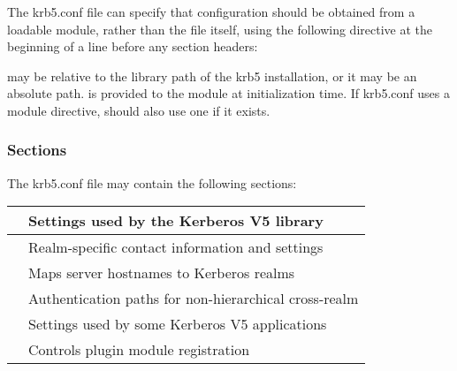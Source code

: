 \documentclass[letterpaper,10pt,english]{sphinxmanual}
\begin{document}
The krb5.conf file can specify that configuration should be obtained
from a loadable module, rather than the file itself, using the
following directive at the beginning of a line before any section
headers:

%
\begin{sphinxVerbatim}[commandchars=\\\{\}]
 
\end{sphinxVerbatim}

 may be relative to the library path of the krb5
installation, or it may be an absolute path.   is provided
to the module at initialization time.  If krb5.conf uses a module
directive, {\hyperref[\detokenize{admin/conf_files/kdc_conf:kdc-conf-5}]{}} should also use one if it exists.


\subsubsection{Sections}
\label{\detokenize{admin/conf_files/krb5_conf:sections}}
The krb5.conf file may contain the following sections:


\begin{savenotes}\sphinxattablestart
\centering
\begin{tabulary}{\linewidth}[t]{|T|T|}
\hline

{\hyperref[\detokenize{admin/conf_files/krb5_conf:libdefaults}]{}}
&
Settings used by the Kerberos V5 library
\\
\hline
{\hyperref[\detokenize{admin/conf_files/krb5_conf:realms}]{}}
&
Realm-specific contact information and settings
\\
\hline
{\hyperref[\detokenize{admin/conf_files/krb5_conf:domain-realm}]{}}
&
Maps server hostnames to Kerberos realms
\\
\hline
{\hyperref[\detokenize{admin/conf_files/krb5_conf:capaths}]{}}
&
Authentication paths for non-hierarchical cross-realm
\\
\hline
{\hyperref[\detokenize{admin/conf_files/krb5_conf:appdefaults}]{}}
&
Settings used by some Kerberos V5 applications
\\
\hline
{\hyperref[\detokenize{admin/conf_files/krb5_conf:plugins}]{}}
&
Controls plugin module registration
\\
\hline
\end{tabulary}
\par
\sphinxattableend\end{savenotes}
\end{document}
